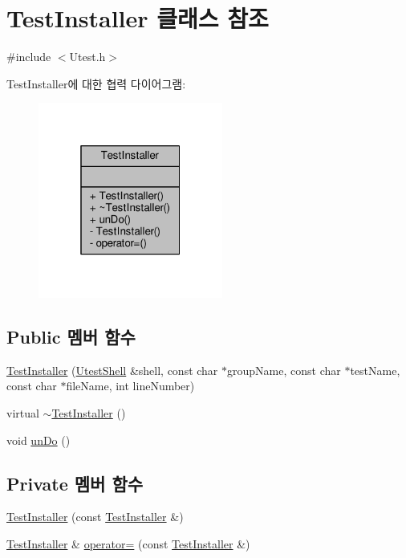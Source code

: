 \hypertarget{class_test_installer}{}\section{Test\+Installer 클래스 참조}
\label{class_test_installer}


{\ttfamily \#include $<$Utest.\+h$>$}



Test\+Installer에 대한 협력 다이어그램\+:
\nopagebreak
\begin{figure}[H]
\begin{center}
\leavevmode
\includegraphics[width=172pt]{class_test_installer__coll__graph}
\end{center}
\end{figure}
\subsection*{Public 멤버 함수}
\begin{DoxyCompactItemize}
\item 
\hyperlink{class_test_installer_a06d22528870a629b050c8392f5d9c0a0}{Test\+Installer} (\hyperlink{class_utest_shell}{Utest\+Shell} \&shell, const char $\ast$group\+Name, const char $\ast$test\+Name, const char $\ast$file\+Name, int line\+Number)
\item 
virtual \hyperlink{class_test_installer_a40c3220b0484f90ec2bd4527105d951d}{$\sim$\+Test\+Installer} ()
\item 
void \hyperlink{class_test_installer_a359934f74e0e64b27fedc6caab497747}{un\+Do} ()
\end{DoxyCompactItemize}
\subsection*{Private 멤버 함수}
\begin{DoxyCompactItemize}
\item 
\hyperlink{class_test_installer_a2a075690aade808f8b581eff5b07bff1}{Test\+Installer} (const \hyperlink{class_test_installer}{Test\+Installer} \&)
\item 
\hyperlink{class_test_installer}{Test\+Installer} \& \hyperlink{class_test_installer_aa3e47fc0444223ac26f2b90f2aa6a841}{operator=} (const \hyperlink{class_test_installer}{Test\+Installer} \&)
\end{DoxyCompactItemize}


